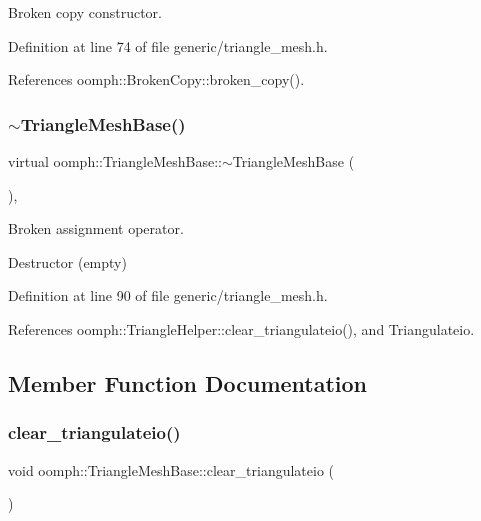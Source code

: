 Broken copy constructor. 



Definition at line 74 of file generic/triangle\+\_\+mesh.\+h.



References oomph\+::\+Broken\+Copy\+::broken\+\_\+copy().

\mbox{\label{classoomph_1_1TriangleMeshBase_af827bac0e7a180b179a835c4db2a8228}} 
\subsubsection{\texorpdfstring{$\sim$\+Triangle\+Mesh\+Base()}{~TriangleMeshBase()}}
{\footnotesize\ttfamily virtual oomph\+::\+Triangle\+Mesh\+Base\+::$\sim$\+Triangle\+Mesh\+Base (\begin{DoxyParamCaption}{ }\end{DoxyParamCaption})\hspace{0.3cm}{\ttfamily [inline]}, {\ttfamily [virtual]}}



Broken assignment operator. 

Destructor (empty) 

Definition at line 90 of file generic/triangle\+\_\+mesh.\+h.



References oomph\+::\+Triangle\+Helper\+::clear\+\_\+triangulateio(), and Triangulateio.



\subsection{Member Function Documentation}
\mbox{\label{classoomph_1_1TriangleMeshBase_a5108f2cdaf673454bbab831da4fbacd5}} 
\subsubsection{\texorpdfstring{clear\+\_\+triangulateio()}{clear\_triangulateio()}}
{\footnotesize\ttfamily void oomph\+::\+Triangle\+Mesh\+Base\+::clear\+\_\+triangulateio (\begin{DoxyParamCaption}{ }\end{DoxyParamCaption})\hspace{0.3cm}{\ttfamily [inline]}}



